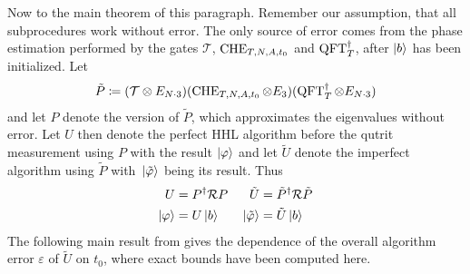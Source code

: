 Now to the main theorem of this paragraph. Remember our assumption, that all subprocedures work without error. The only source of error comes from the phase estimation performed by the gates \(\mathcal{T}\), \(\operatorname{CHE}_{T, N, A, t_0}\) and \(\operatorname{QFT}_T^\dagger\), after \(\ket{b}\) has been initialized. Let
\begin{align}
    \tilde{P} \coloneqq (\mathcal{T} \otimes E_{N \cdot 3})(\operatorname{CHE}_{T, N, A, t_0} \otimes E_3)(\operatorname{QFT}_T^\dagger \otimes E_{N \cdot 3})
\end{align}
and let \(P\) denote the version of \(\tilde{P}\), which approximates the eigenvalues without error. Let \(U\) then denote the perfect HHL algorithm before the qutrit measurement using \(P\) with the result \(\ket{\varphi}\) and let \(\tilde{U}\) denote the imperfect algorithm using \(\tilde{P}\) with \(\ket*{\tilde{\varphi}}\) being its result. Thus
\begin{align}
    U &= P^\dagger \mathcal{R} P & \tilde{U} &= \tilde{P}^\dagger \mathcal{R} \tilde{P}\\
    \ket{\varphi} &= U\ket{b} & \ket*{\tilde{\varphi}} &= \tilde{U}\ket{b}
\end{align}
The following main result from \cite[pp. 7-10]{Harrow2008} gives the dependence of the overall algorithm error \(\varepsilon\) of \(\tilde{U}\) on \(t_0\), where exact bounds have been computed here.

